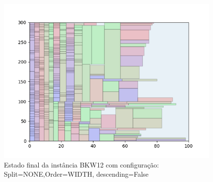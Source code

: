 \begin{figure}[H]
    \centering
    \caption[]{Estado final da instância BKW12 com configuração: Split=NONE,Order=WIDTH, descending=False}
    \label{fig:bkw12-none-width-false}
    \includegraphics[scale=0.5]{output/figures/bkw/bkw12/none/width/false/000}
\end{figure}